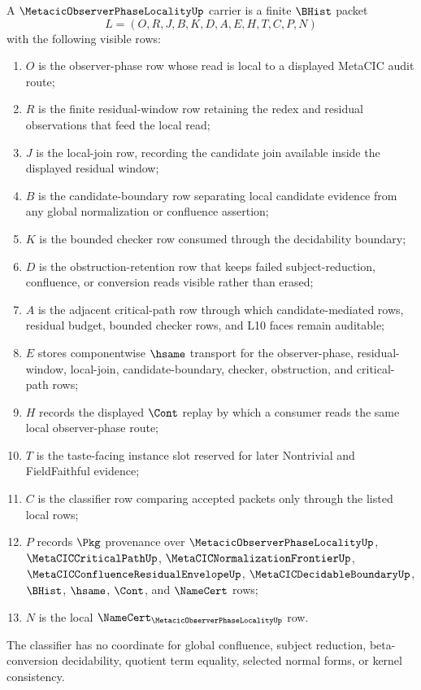 \begin{definition}
\label{def:metacic-observer-phase-locality-carrier}
A $\MetacicObserverPhaseLocalityUp$ carrier is a finite $\BHist$ packet
$$
L=(O,R,J,B,K,D,A,E,H,T,C,P,N)
$$
with the following visible rows:
\begin{enumerate}
\item $O$ is the observer-phase row whose read is local to a displayed MetaCIC audit route;
\item $R$ is the finite residual-window row retaining the redex and residual observations that feed the local read;
\item $J$ is the local-join row, recording the candidate join available inside the displayed residual window;
\item $B$ is the candidate-boundary row separating local candidate evidence from any global normalization or confluence assertion;
\item $K$ is the bounded checker row consumed through the decidability boundary;
\item $D$ is the obstruction-retention row that keeps failed subject-reduction, confluence, or conversion reads visible rather than erased;
\item $A$ is the adjacent critical-path row through which candidate-mediated rows, residual budget, bounded checker rows, and L10 faces remain auditable;
\item $E$ stores componentwise $\hsame$ transport for the observer-phase, residual-window, local-join, candidate-boundary, checker, obstruction, and critical-path rows;
\item $H$ records the displayed $\Cont$ replay by which a consumer reads the same local observer-phase route;
\item $T$ is the taste-facing instance slot reserved for later Nontrivial and FieldFaithful evidence;
\item $C$ is the classifier row comparing accepted packets only through the listed local rows;
\item $P$ records $\Pkg$ provenance over $\MetacicObserverPhaseLocalityUp$, $\MetaCICCriticalPathUp$, $\MetaCICNormalizationFrontierUp$, $\MetaCICConfluenceResidualEnvelopeUp$, $\MetaCICDecidableBoundaryUp$, $\BHist$, $\hsame$, $\Cont$, and $\NameCert$ rows;
\item $N$ is the local $\NameCert_{\MetacicObserverPhaseLocalityUp}$ row.
\end{enumerate}
The classifier has no coordinate for global confluence, subject reduction, beta-conversion decidability, quotient term equality, selected normal forms, or kernel consistency.
\end{definition}

